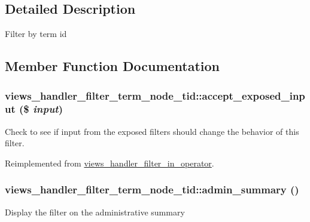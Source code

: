\subsection{Detailed Description}
Filter by term id 

\subsection{Member Function Documentation}
\hypertarget{classviews__handler__filter__term__node__tid_75f38674ff356981f6e77f009da2101a}{
\subsubsection[{accept\_\-exposed\_\-input}]{\setlength{\rightskip}{0pt plus 5cm}views\_\-handler\_\-filter\_\-term\_\-node\_\-tid::accept\_\-exposed\_\-input (\$ {\em input})}}
\label{classviews__handler__filter__term__node__tid_75f38674ff356981f6e77f009da2101a}


Check to see if input from the exposed filters should change the behavior of this filter. 

Reimplemented from \hyperlink{classviews__handler__filter__in__operator_ff2b25941729b9ca81e1e53bb8e95a96}{views\_\-handler\_\-filter\_\-in\_\-operator}.\hypertarget{classviews__handler__filter__term__node__tid_392046588b13b1b76223eb22ba4ff660}{
\subsubsection[{admin\_\-summary}]{\setlength{\rightskip}{0pt plus 5cm}views\_\-handler\_\-filter\_\-term\_\-node\_\-tid::admin\_\-summary ()}}
\label{classviews__handler__filter__term__node__tid_392046588b13b1b76223eb22ba4ff660}


Display the filter on the administrative summary 

